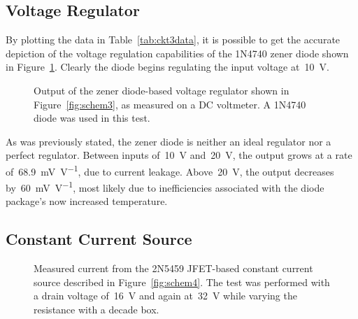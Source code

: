 \subsection{Voltage Regulator}
By plotting the data in Table~\ref{tab:ckt3data}, it is possible to get the
accurate depiction of the voltage regulation capabilities of the 1N4740 zener
diode shown in Figure~\ref{fig:ckt3plot}.  Clearly the diode begins regulating
the input voltage at~\SI{10}{\volt}.
%
\begin{figure}[H]
	\centering
	
	\parbox{4.25in}{
	\caption{Output of the zener diode-based voltage regulator shown in
		Figure~\ref{fig:schem3}, as measured on a DC voltmeter.  A 1N4740 diode
		was used in this test.}
	\label{fig:ckt3plot}}
\end{figure}
%
As was previously stated, the zener diode is neither an ideal regulator nor a
perfect regulator.  Between inputs of~\SI{10}{\volt} and~\SI{20}{\volt}, the
output grows at a rate of~\SI{68.9}{\milli\volt\per\volt}, due to current
leakage.  Above~\SI{20}{\volt}, the output decreases
by~\SI{60}{\milli\volt\per\volt}, most likely due to inefficiencies associated
with the diode package's now increased temperature.

\subsection{Constant Current Source}
\begin{figure}[H]
	\centering
	
	\parbox{4.25in}{
	\caption{Measured current from the 2N5459 JFET-based constant current
		source described in Figure~\ref{fig:schem4}.  The test was performed
		with a drain voltage of~\SI{16}{\volt} and again at~\SI{32}{\volt}
		while varying the resistance with a decade box.}
	\label{fig:ckt4plot}}
\end{figure}

